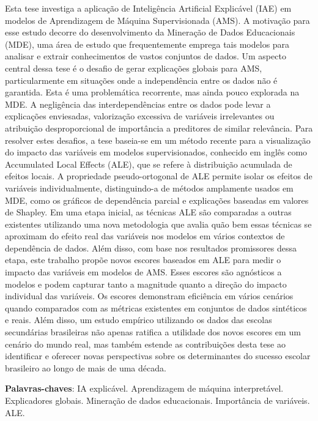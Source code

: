 
\begin{resumo}[Resumo] 
Esta tese investiga a aplicação de Inteligência Artificial Explicável (IAE) em modelos de Aprendizagem de Máquina Supervisionada (AMS). A motivação para esse estudo decorre do desenvolvimento da Mineração de Dados Educacionais (MDE), uma área de estudo que frequentemente emprega tais modelos para analisar e extrair conhecimentos de vastos conjuntos de dados. Um aspecto central dessa tese é o desafio de gerar explicações globais para AMS, particularmente em situações onde a independência entre os dados não é garantida. Esta é uma problemática recorrente, mas ainda pouco explorada na MDE. A negligência das interdependências entre os dados pode levar a explicações enviesadas, valorização excessiva de variáveis irrelevantes ou atribuição desproporcional de importância a preditores de similar relevância. Para resolver estes desafios, a tese baseia-se em um método recente para a visualização do impacto das variáveis em modelos supervisionados, conhecido em inglês como Accumulated Local Effects (ALE), que se refere à distribuição acumulada de efeitos locais. A propriedade pseudo-ortogonal de ALE permite isolar os efeitos de variáveis individualmente, distinguindo-a de métodos amplamente usados em MDE, como os gráficos de dependência parcial e explicações baseadas  em valores de Shapley. Em uma etapa inicial, as técnicas ALE são comparadas a outras existentes utilizando uma nova metodologia que avalia quão bem essas técnicas se aproximam do efeito real das variáveis nos modelos em vários contextos de dependência de dados. Além disso, com base nos resultados promissores dessa etapa, este trabalho propõe novos escores baseados em ALE para medir o impacto das variáveis em modelos de AMS. Esses escores são agnósticos a modelos e podem capturar tanto a magnitude quanto a direção do impacto individual das variáveis. Os escores demonstram eficiência em vários cenários quando comparados com as métricas existentes em conjuntos de dados sintéticos e reais. Além disso, um estudo empírico utilizando os dados das escolas secundárias brasileiras não apenas ratifica a utilidade dos novos escores em um cenário do mundo real, mas também estende as contribuições desta tese ao identificar e oferecer novas perspectivas sobre os determinantes do sucesso escolar brasileiro ao longo de mais de uma década.


 \vspace{\onelineskip}
    
 \noindent
 \textbf{Palavras-chaves}: IA explicável. Aprendizagem de máquina interpretável.  Explicadores globais. Mineração de dados educacionais. Importância de variáveis. ALE.
\end{resumo}

